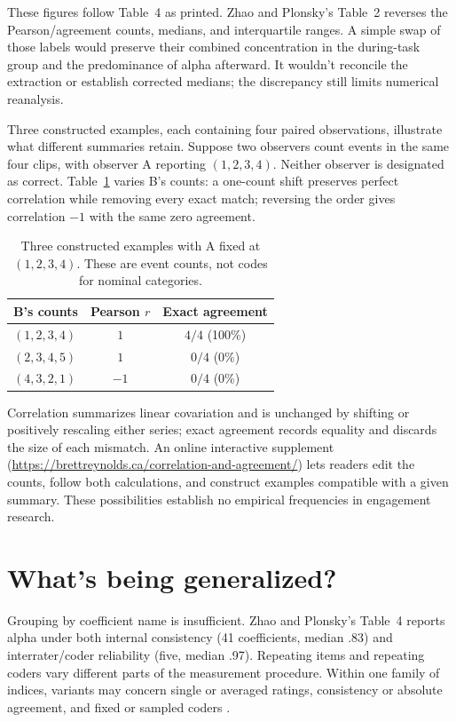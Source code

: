\documentclass[12pt,twoside]{article}
\begin{document}
These figures follow Table~4 as printed. Zhao and Plonsky's Table~2 reverses the Pearson/agreement counts, medians, and interquartile ranges. A simple swap of those labels would preserve their combined concentration in the during-task group and the predominance of alpha afterward. It wouldn't reconcile the extraction or establish corrected medians; the discrepancy still limits numerical reanalysis.

Three constructed examples, each containing four paired observations, illustrate what different summaries retain. Suppose two observers count events in the same four clips, with observer A reporting $(1,2,3,4)$. Neither observer is designated as correct. Table~\ref{tab:correlation-agreement} varies B's counts: a one-count shift preserves perfect correlation while removing every exact match; reversing the order gives correlation $-1$ with the same zero agreement.

\begin{table}[tbp]
\centering
\caption{Three constructed examples with A fixed at $(1,2,3,4)$. These are event counts, not codes for nominal categories.}
\label{tab:correlation-agreement}
\begin{tabular}{@{}lcc@{}}
\toprule
B's counts & Pearson $r$ & Exact agreement \\
\midrule
$(1,2,3,4)$ & $1$ & $4/4$ (100\%) \\
$(2,3,4,5)$ & $1$ & $0/4$ (0\%) \\
$(4,3,2,1)$ & $-1$ & $0/4$ (0\%) \\
\bottomrule
\end{tabular}
\end{table}

Correlation summarizes linear covariation and is unchanged by shifting or positively rescaling either series; exact agreement records equality and discards the size of each mismatch. An online interactive supplement (\url{https://brettreynolds.ca/correlation-and-agreement/}) lets readers edit the counts, follow both calculations, and construct examples compatible with a given summary. These possibilities establish no empirical frequencies in engagement research.

\section{What's being generalized?}

Grouping by coefficient name is insufficient. Zhao and Plonsky's Table~4 reports alpha under both internal consistency (41 coefficients, median .83) and interrater/coder reliability (five, median .97). Repeating items and repeating coders vary different parts of the measurement procedure. Within one family of indices, variants may concern single or averaged ratings, consistency or absolute agreement, and fixed or sampled coders \citep[p.\ 30]{Hallgren2012}.
\end{document}
